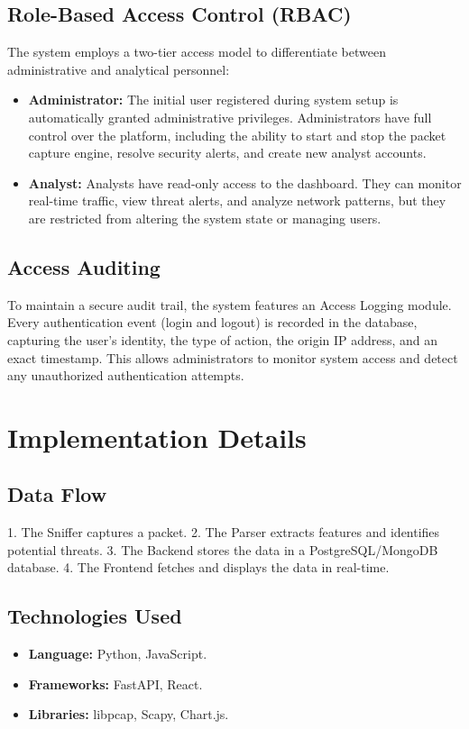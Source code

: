\subsection{Role-Based Access Control (RBAC)}
The system employs a two-tier access model to differentiate between administrative and analytical personnel:
\begin{itemize}
    \item \textbf{Administrator:} The initial user registered during system setup is automatically granted administrative privileges. Administrators have full control over the platform, including the ability to start and stop the packet capture engine, resolve security alerts, and create new analyst accounts.
    \item \textbf{Analyst:} Analysts have read-only access to the dashboard. They can monitor real-time traffic, view threat alerts, and analyze network patterns, but they are restricted from altering the system state or managing users.
\end{itemize}

\subsection{Access Auditing}
To maintain a secure audit trail, the system features an Access Logging module. Every authentication event (login and logout) is recorded in the database, capturing the user's identity, the type of action, the origin IP address, and an exact timestamp. This allows administrators to monitor system access and detect any unauthorized authentication attempts.

\section{Implementation Details}
\subsection{Data Flow}
1. The Sniffer captures a packet.
2. The Parser extracts features and identifies potential threats.
3. The Backend stores the data in a PostgreSQL/MongoDB database.
4. The Frontend fetches and displays the data in real-time.

\subsection{Technologies Used}
\begin{itemize}
    \item \textbf{Language:} Python, JavaScript.
    \item \textbf{Frameworks:} FastAPI, React.
    \item \textbf{Libraries:} libpcap, Scapy, Chart.js.
\end{itemize}
